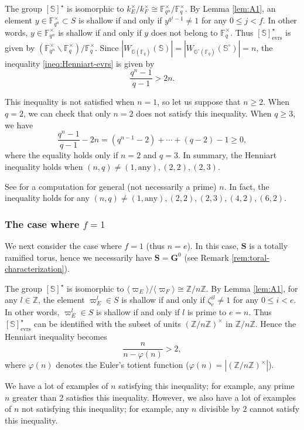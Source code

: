 \documentclass{amsart}
\newcommand{\evrs}{\mathrm{evrs}}
\newcommand{\Z}{\mathbb{Z}}
\newcommand{\F}{\mathbb{F}}
\newcommand{\bbS}{\mathbb{S}}
\newcommand{\bbG}{\mathbb{G}}
\newcommand{\bfG}{\mathbf{G}}
\newcommand{\bfS}{\mathbf{S}}
\theoremstyle{plain}
\theoremstyle{definition}
\theoremstyle{remark}
\theoremstyle{theorem}
\begin{document}
The group $[\bbS]^{\star}$ is isomorphic to $k_{E}^{\times}/k_{F}^{\times}\cong\F_{q^{n}}^{\times}/\F_{q}^{\times}$.
By Lemma \ref{lem:A1}, an element $y\in \F_{q^{n}}^{\times}\subset S$ is shallow if and only if $y^{q^{j}-1}\neq1$ for any $0\leq j<f$.
In other words, $y\in \F_{q^{n}}^{\times}$ is shallow if and only if $y$ does not belong to $\F_{q}^{\times}$.
Thus $[\bbS]^{\star}_{\evrs}$ is given by $(\F_{q^{n}}^{\times}\smallsetminus\F_{q}^{\times})/\F_{q}^{\times}$.
Since $|W_{\bbG(\F_{q})}(\bbS)|=|W_{\bbG^{\circ}(\F_{q})}(\bbS^{\circ})|=n$, the inequality \eqref{ineq:Henniart-evrs} is given by 
\[
\frac{q^{n}-1}{q-1}>2n.
\]

This inequality is not satisfied when $n=1$, so let us suppose that $n\geq2$.
When $q=2$, we can check that only $n=2$ does not satisfy this inequality.
When $q\geq3$, we have
\[
\frac{q^{n}-1}{q-1}-2n
=(q^{n-1}-2)+\cdots+(q-2)-1\geq0,
\]
where the equality holds only if $n=2$ and $q=3$.
In summary, the Henniart inequality holds when $(n,q)\neq(1,\text{any}), (2,2), (2,3)$.

See \cite[Section 2.7]{Hen92} for a computation for general (not necessarily a prime) $n$.
In fact, the inequality holds for any $(n,q)\neq(1,\text{any}), (2,2), (2,3), (4,2), (6,2)$.

\subsubsection{The case where $f=1$}\label{subsubsec:f=1}
We next consider the case where $f=1$ (thus $n=e$).
In this case, $\bfS$ is a totally ramified torus, hence we necessarily have $\bfS=\bfG^{0}$ (see Remark \ref{rem:toral-characterization}).

The group $[\bbS]^{\star}$ is isomorphic to $\langle\varpi_{E}\rangle/\langle\varpi_{F}\rangle\cong \Z/n\Z$.
By Lemma \ref{lem:A1}, for any $l\in\Z$, the element $\varpi_{E}^{l}\in S$ is shallow if and only if $\zeta_{e}^{il}\neq1$ for any $0\leq i<e$.
In other words, $\varpi_{E}^{l}\in S$ is shallow if and only if $l$ is prime to $e=n$.
Thus $[\bbS]^{\star}_{\evrs}$ can be identified with the subset of units $(\Z/n\Z)^{\times}$ in $\Z/n\Z$.
Hence the Henniart inequality becomes
\[
\frac{n}{n-\varphi(n)}>2,
\]
where $\varphi(n)$ denotes the Euler's totient function ($\varphi(n)=|(\Z/n\Z)^{\times}|$).

We have a lot of examples of $n$ satisfying this inequality; for example, any prime $n$ greater than $2$ satisfies this inequality.
However, we also have a lot of examples of $n$ not satisfying this inequality; for example, any $n$ divisible by $2$ cannot satisfy this inequality.
\end{document}
